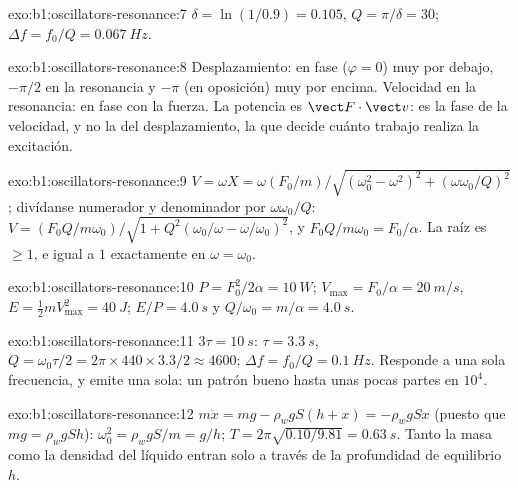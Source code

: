 \begin{solution}{exo:b1:oscillators-resonance:7}
$\delta = \ln(1/0.9) = 0.105$, $Q = \pi/\delta = 30$; $\Delta f = f_0/Q =
\qty{0.067}{Hz}$.
\end{solution}

\begin{solution}{exo:b1:oscillators-resonance:8}
Desplazamiento: en fase ($\varphi = 0$) muy por debajo, $-\pi/2$ en la
resonancia y $-\pi$ (en oposición) muy por encima. Velocidad en la
resonancia: en fase con la fuerza. La potencia es $\vect F\cdot\vect v$:
es la fase de la velocidad, y no la del desplazamiento, la que decide
cuánto trabajo realiza la excitación.
\end{solution}

\begin{solution}{exo:b1:oscillators-resonance:9}
$V = \omega X = \omega(F_0/m)/\sqrt{(\omega_0^2 - \omega^2)^2 + (\omega\omega_0/Q)^2}$;
divídanse numerador y denominador por $\omega\omega_0/Q$: $V = (F_0Q/m\omega_0)/
\sqrt{1 + Q^2(\omega_0/\omega - \omega/\omega_0)^2}$, y $F_0Q/m\omega_0 = F_0/\alpha$.
La raíz es $\geq 1$, e igual a $1$ exactamente en $\omega = \omega_0$.
\end{solution}

\begin{solution}{exo:b1:oscillators-resonance:10}
$P = F_0^2/2\alpha = \qty{10}{W}$; $V_{\max} = F_0/\alpha = \qty{20}{m/s}$,
$E = \tfrac12 mV_{\max}^2 = \qty{40}{J}$; $E/P = \qty{4.0}{s}$ y $Q/\omega_0 =
m/\alpha = \qty{4.0}{s}$.
\end{solution}

\begin{solution}{exo:b1:oscillators-resonance:11}
$3\tau = \qty{10}{s}$: $\tau = \qty{3.3}{s}$, $Q = \omega_0\tau/2 = 2\pi \times
440 \times 3.3/2 \approx 4600$; $\Delta f = f_0/Q = \qty{0.1}{Hz}$. Responde
a una sola frecuencia, y emite una sola: un patrón bueno hasta unas pocas
partes en $10^4$.
\end{solution}

\begin{solution}{exo:b1:oscillators-resonance:12}
$m\ddot x = mg - \rho_wgS(h + x) = -\rho_wgSx$ (puesto que $mg = \rho_wgSh$):
$\omega_0^2 = \rho_wgS/m = g/h$; $T = 2\pi\sqrt{0.10/9.81} = \qty{0.63}{s}$.
Tanto la masa como la densidad del líquido entran solo a través de la
profundidad de equilibrio $h$.
\end{solution}

